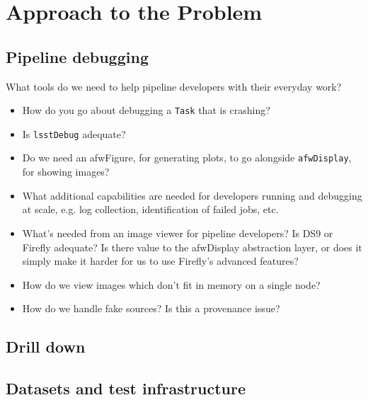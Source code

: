 \section{Approach to the Problem}
\label{sec:approach}


\subsection{Pipeline debugging}


What tools do we need to help pipeline developers with their everyday work?

\begin{itemize}

  \item{How do you go about debugging a \texttt{Task} that is crashing?}
  \item{Is \texttt{lsstDebug} adequate?}
  \item{Do we need an afwFigure, for generating plots, to go alongside \texttt{afwDisplay}, for showing images?}
  \item{What additional capabilities are needed for developers running and debugging at scale, e.g. log collection, identification of failed jobs, etc.}
  \item{What's needed from an image viewer for pipeline developers? Is DS9 or Firefly adequate? Is there value to the afwDisplay abstraction layer, or does it simply make it harder for us to use Firefly's advanced features?}
  \item{How do we view images which don't fit in memory on a single node?}
  \item{How do we handle fake sources? Is this a provenance issue?}

\end{itemize}

\subsection{Drill down}


\subsection{Datasets and test infrastructure}

